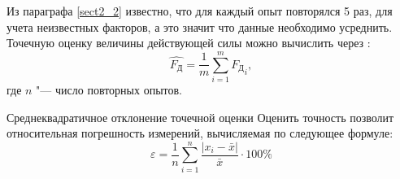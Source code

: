 Из параграфа \ref{sect2_2} известно, что для каждый опыт повторялся 5 раз, для учета неизвестных факторов, а это значит что данные необходимо усреднить. Точечную оценку величины действующей силы можно вычислить через \cite{Zajigaev}:
\begin{equation}\label{eq:x_ocenka}
\hat{F_\text{Д}}=\frac{1}{m}\sum_{i=1}^{m} {F_\text{Д}}_i,
\end{equation}
где $ n $ "--- число повторных опытов.

Среднеквадратичное отклонение точечной оценки Оценить точность позволит относительная погрешность измерений, вычисляемая по следующее формуле:
\begin{equation}\label{eq:Error}
\varepsilon=\frac{1}{n}\sum_{i=1}^{n} \frac{\left| x_i-\bar{x}\right| }{\bar{x}}\cdot100\%
\end{equation}